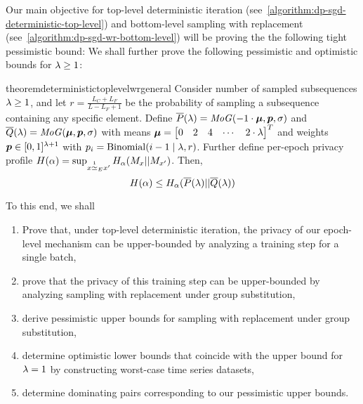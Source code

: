 Our main objective for top-level deterministic iteration (see~\cref{algorithm:dp-sgd-deterministic-top-level}) and bottom-level sampling with replacement (see~\cref{algorithm:dp-sgd-wr-bottom-level}) will be proving the the following tight pessimistic bound:
\deterministictoplevelwr*
We shall further prove the following pessimistic and optimistic bounds for $\lambda \geq 1$:
\begin{restatable}{theorem}{deterministictoplevelwrgeneral}\label{theorem:deterministic_top_level_wr_general}
    Consider number of sampled subsequences $\lambda \geq 1$,
    and let $r = \frac{L_C + L_F}{L - L_F + 1}$ be the probability of sampling a subsequence containing any specific element.
    Define
    $\overline{P}(\lambda) = \mathit{MoG}(-1 \cdot {\bm{\mu}}, {\bm{p}}, \sigma)$
    and
    $\overline{Q}(\lambda) = \mathit{MoG}({\bm{\mu}}, {\bm{p}}, \sigma)$
    with
    means ${\bm{\mu}} = \begin{bmatrix}
        0 & 2 &  4 & \cdots & 2 \cdot \lambda
    \end{bmatrix}^T$ and 
    weights ${\bm{p}} \in [0,1]^{\lambda + 1}$ with $p_i = \mathrm{Binomial}(i-1 \mid \lambda, r)$.
    Further define per-epoch privacy profile $H(\alpha) = \sup_{x \overset{1}{\simeq}_{E} x'} H_\alpha(M_x || M_{x'})$. Then, 
    \begin{equation*}
        H(\alpha) \leq 
            H_\alpha(\overline{P}(\lambda) || \overline{Q}(\lambda))
    \end{equation*}
\end{restatable}
\deterministictoplevelwroptimistic*

To this end, we shall 
\begin{enumerate}
    \item Prove that, under top-level deterministic iteration, the privacy of our epoch-level mechanism can be upper-bounded by  analyzing a training step for a single batch,
    \item prove that the privacy of this training step can be upper-bounded by analyzing sampling with replacement under group substitution,
    \item derive pessimistic upper bounds for sampling with replacement under group substitution,
    \item determine optimistic lower bounds that coincide with the upper bound for $\lambda=1$ by constructing worst-case time series datasets,
    \item determine dominating pairs corresponding to our pessimistic upper bounds.
\end{enumerate}

